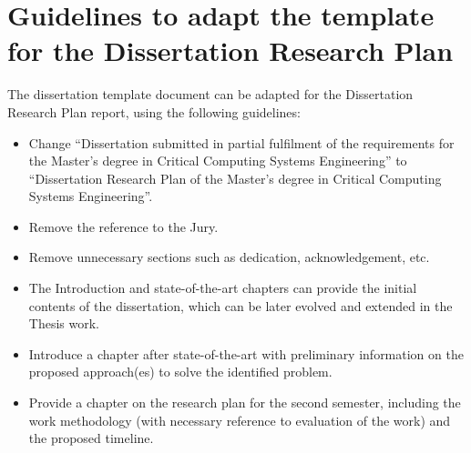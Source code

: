 
\chapter{Guidelines to adapt the template for the Dissertation Research Plan} %

\label{AppendixA} %

The dissertation template document can be adapted for the Dissertation Research Plan report, using the following guidelines:
\begin{itemize}
\item Change “Dissertation submitted in partial fulfilment of the requirements for the Master’s degree in Critical Computing Systems Engineering” to “Dissertation Research Plan of the Master’s degree in Critical Computing Systems Engineering”.
\item	Remove the reference to the Jury.
\item	Remove unnecessary sections such as dedication, acknowledgement, etc.
\item	The Introduction and state-of-the-art chapters can provide the initial contents of the dissertation, which can be later evolved and extended in the Thesis work.
\item	Introduce a chapter after state-of-the-art with preliminary information on the proposed approach(es) to solve the identified problem. 
\item	Provide a chapter on the research plan for the second semester, including the work methodology (with necessary reference to evaluation of the work) and the proposed timeline.
\end{itemize}
